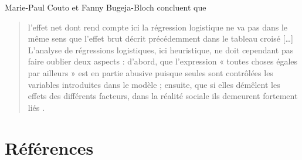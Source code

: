 \documentclass[
  french,
]{book}
\begin{document}
Marie-Paul Couto et Fanny Bugeja-Bloch concluent que

\begin{quote}
l'effet net dont rend compte ici la régression logistique ne va pas dans le même sens que l'effet brut décrit précédemment dans le tableau croisé {[}\ldots{]} L'analyse de régressions logistiques, ici heuristique, ne doit cependant pas faire oublier deux aspects : d'abord, que l'expression « toutes choses égales par ailleurs » est en partie abusive puisque seules sont contrôlées les variables introduites dans le modèle ; ensuite, que si elles démêlent les effets des différents facteurs, dans la réalité sociale ils demeurent fortement liés \citep[p.~104]{bugeja-bloch2021}.
\end{quote}

\hypertarget{ruxe9fuxe9rences}{%
\chapter*{Références}\label{ruxe9fuxe9rences}}

  
\end{document}
